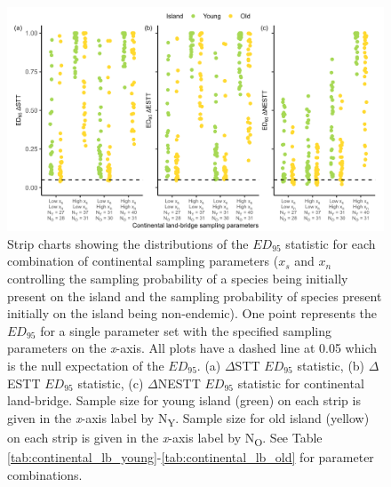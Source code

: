 \begin{figure}
    \centering
    \includegraphics[width=\textwidth]{JBI-21-0508_FigS13.png}
    \caption{Strip charts showing the distributions of the $ED_{95}$ statistic for each combination of continental sampling parameters ($x_s$ and $x_n$ controlling the sampling probability of a species being initially present on the island and the sampling probability of species present initially on the island being non-endemic). One point represents the $ED_{95}$ for a single parameter set with the specified sampling parameters on the \textit{x}-axis. All plots have a dashed line at 0.05 which is the null expectation of the $ED_{95}$. (a) $\Delta$STT $ED_{95}$ statistic, (b) $\Delta$ESTT $ED_{95}$ statistic, (c) $\Delta$NESTT $ED_{95}$ statistic for continental land-bridge. Sample size for young island (green) on each strip is given in the \textit{x}-axis label by N\textsubscript{Y}. Sample size for old island (yellow) on each strip is given in the \textit{x}-axis label by N\textsubscript{O}. See Table \ref{tab:continental_lb_young}-\ref{tab:continental_lb_old} for parameter combinations.}
    \label{fig:continental_land_bridge_sample_facet}
\end{figure}

